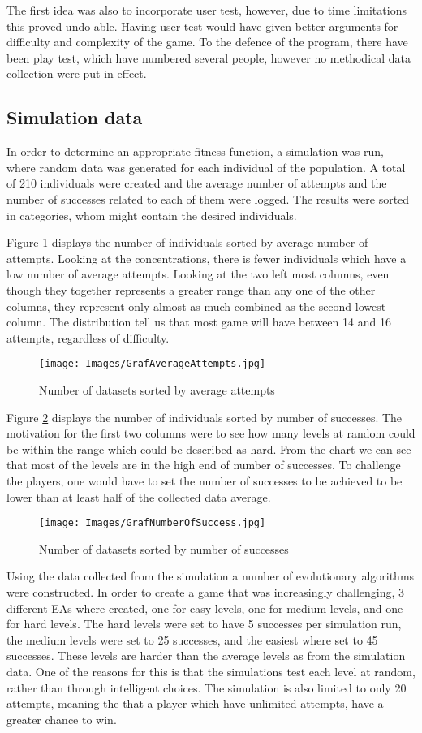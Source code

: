 \documentclass[a4paper,11pt]{article}
\begin{document}
The first idea was also to incorporate user test, however, due to time limitations this proved undo-able. Having user test would have given better arguments for difficulty and complexity of the game. To the defence of the program, there have been play test, which have numbered several people, however no methodical data collection were put in effect. 
\subsection{Simulation data}
In order to determine an appropriate fitness function, a simulation was run, where random data was generated for each individual of the population. A total of 210 individuals were created and the average number of attempts and the number of successes related to each of them were logged. The results were sorted in categories, whom might contain the desired individuals. 

Figure \ref{fig:averattem} displays the number of individuals sorted by average number of attempts. Looking at the concentrations, there is fewer individuals which have a low number of average attempts. Looking at the two left most columns, even though they together represents a greater range than any one of the other columns, they represent only almost as much combined as the second lowest column. The distribution tell us that most game will have between 14 and 16 attempts, regardless of difficulty. 
\begin{figure}[h]
    \centering
    \texttt{[image: Images/GrafAverageAttempts.jpg]}
    \caption{Number of datasets sorted by average attempts}
    \label{fig:averattem}
\end{figure}

Figure \ref{fig:numsucces} displays the number of individuals sorted by number of successes. The motivation for the first two columns were to see how many levels at random could be within the range which could be described as hard. From the chart we can see that most of the levels are in the high end of number of successes. To challenge the players, one would have to set the number of successes to be achieved to be lower than at least half of the collected data average.
\begin{figure}[h]
    \centering
    \texttt{[image: Images/GrafNumberOfSuccess.jpg]}
    \caption{Number of datasets sorted by number of successes}
    \label{fig:numsucces}
\end{figure}

Using the data collected from the simulation a number of evolutionary algorithms were constructed. In order to create a game that was increasingly challenging, 3 different EAs where created, one for easy levels, one for medium levels, and one for hard levels. 
The hard levels were set to have 5 successes per simulation run, the medium levels were set to 25 successes, and the easiest where set to 45 successes. These levels are harder than the average levels as from the simulation data. One of the reasons for this is that the simulations test each level at random, rather than through intelligent choices. The simulation is also limited to only 20 attempts, meaning the that a player which have unlimited attempts, have a greater chance to win. 
\end{document}
